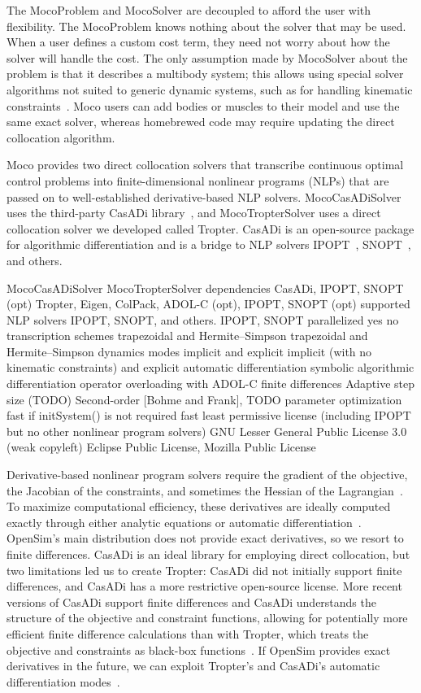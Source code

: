 \documentclass[10pt,letterpaper]{article}
\begin{document}
The MocoProblem and MocoSolver are decoupled to afford the user with flexibility. The MocoProblem knows nothing about the solver that may be used. When a user defines a custom cost term, they need not worry about how the solver will handle the cost. The only assumption made by MocoSolver about the problem is that it describes a multibody system; this allows using special solver algorithms not suited to generic dynamic systems, such as for handling kinematic constraints~\cite{Posa:2015}. Moco users can add bodies or muscles to their model and use the same exact solver, whereas homebrewed code may require updating the direct collocation algorithm.

Moco provides two direct collocation solvers that transcribe continuous optimal control problems into finite-dimensional nonlinear programs (NLPs) that are passed on to well-established derivative-based NLP solvers. MocoCasADiSolver uses the third-party CasADi library~\cite{Andersson:2019}, and MocoTropterSolver uses a direct collocation solver we developed called Tropter. CasADi is an open-source package for algorithmic differentiation and is a bridge to NLP solvers IPOPT~\cite{Wachter:2006}, SNOPT~\cite{Gill:2005}, and others.



MocoCasADiSolver
MocoTropterSolver
dependencies
CasADi, IPOPT, SNOPT (opt)
Tropter, Eigen, ColPack, ADOL-C (opt), IPOPT, SNOPT (opt)
supported NLP solvers
IPOPT, SNOPT, and others.
IPOPT, SNOPT
parallelized
yes
no
transcription schemes
trapezoidal and Hermite–Simpson
trapezoidal and Hermite–Simpson
dynamics modes
implicit and explicit
implicit (with no kinematic constraints) and explicit
automatic differentiation
symbolic algorithmic differentiation
operator overloading with ADOL-C
finite differences
Adaptive step size (TODO)
Second-order [Bohme and Frank], TODO
parameter optimization
fast if initSystem() is not required
fast
least permissive license (including IPOPT but no other nonlinear program solvers)
GNU Lesser General Public License 3.0 (weak copyleft)
Eclipse Public License, Mozilla Public License

Derivative-based nonlinear program solvers require the gradient of the objective, the Jacobian of the constraints, and sometimes the Hessian of the Lagrangian~\cite{Betts:2010}. To maximize computational efficiency, these derivatives are ideally computed exactly through either analytic equations or automatic differentiation~\cite{Andersson:2019,Walther:2003}. OpenSim’s main distribution does not provide exact derivatives, so we resort to finite differences. CasADi is an ideal library for employing direct collocation, but two limitations led us to create Tropter: CasADi did not initially support finite differences, and CasADi has a more restrictive open-source license. More recent versions of CasADi support finite differences and CasADi understands the structure of the objective and constraint functions, allowing for potentially more efficient finite difference calculations than with Tropter, which treats the objective and constraints as black-box functions~\cite{Patterson:2012}. If OpenSim provides exact derivatives in the future, we can exploit Tropter’s and CasADi’s automatic differentiation modes~\cite{Falisse:2019a}.
\end{document}
